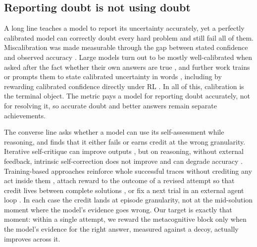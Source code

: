 \subsection{Reporting doubt is not using doubt}
\label{sec:related:calibration}

A long line teaches a model to report its uncertainty accurately, yet a
perfectly calibrated model can correctly doubt every hard problem and still fail
all of them. Miscalibration was made measurable through the gap between stated
confidence and observed accuracy \citep{guo2017calibration}. Large models turn
out to be mostly well-calibrated when asked after the fact whether their own
answers are true \citep{kadavath2022language}, and further work trains or prompts
them to state calibrated uncertainty in words
\citep{lin2022teaching, tian2023just}, including by rewarding calibrated
confidence directly under RL \citep{baniharouni2026rewardingdoubtreinforcementlearning}.
In all of this, calibration is the terminal object. The metric pays a model for
reporting doubt accurately, not for resolving it, so accurate doubt and better
answers remain separate achievements.

The converse line asks whether a model can use its self-assessment while
reasoning, and finds that it either fails or earns credit at the wrong
granularity. Iterative self-critique can improve outputs \citep{madaan2023selfrefine},
but on reasoning, without external feedback, intrinsic self-correction does not
improve and can degrade accuracy \citep{huang2024llmcannot}. Training-based
approaches reinforce whole successful traces without crediting any act inside
them \citep{zelikman2022star}, attach reward to the outcome of a revised attempt
so that credit lives between complete solutions \citep{kumar2024score}, or fix a
next trial in an external agent loop \citep{shinn2023reflexionlanguageagentsverbal}.
In each case the credit lands at episode granularity, not at the mid-solution
moment where the model's evidence goes wrong. Our target is exactly that moment:
within a single attempt, we reward the metacognitive block only when the model's
evidence for the right answer, measured against a decoy, actually improves across
it.
